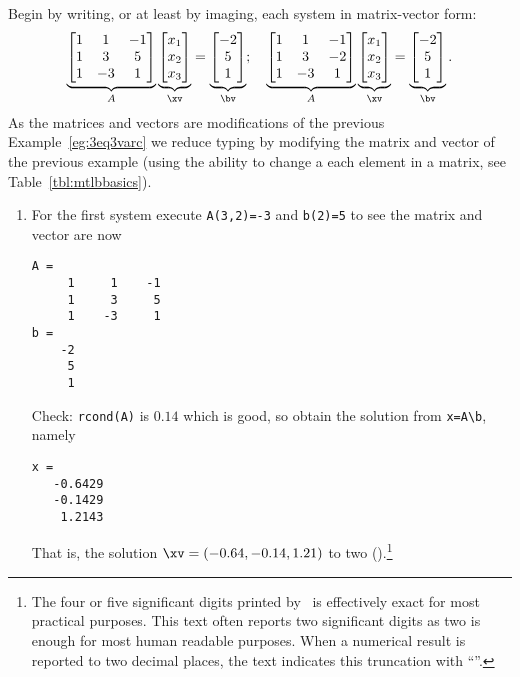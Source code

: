 \begin{example}
\begin{solution} 
Begin by writing, or at least by imaging, each system in matrix-vector form:
\begin{equation*}
\underbrace{\begin{bmatrix} 1&1&-1\\ 1&3&5\\1&-3&1 \end{bmatrix}}_A
\underbrace{\begin{bmatrix} x_1\\x_2\\x_3 \end{bmatrix}}_\xv
=\underbrace{\begin{bmatrix} -2\\5\\1 \end{bmatrix}}_\bv ;
\quad
\underbrace{\begin{bmatrix} 1&1&-1\\ 1&3&-2\\1&-3&1 \end{bmatrix}}_A
\underbrace{\begin{bmatrix} x_1\\x_2\\x_3 \end{bmatrix}}_\xv
=\underbrace{\begin{bmatrix} -2\\5\\1 \end{bmatrix}}_\bv .
\end{equation*}
As the matrices and vectors are modifications of the previous Example~\ref{eg:3eq3varc} we reduce typing by modifying the matrix and vector of the previous example (using the ability to change a each element in a matrix, see Table~\ref{tbl:mtlbbasics}).
\begin{enumerate}
\item For the first system execute \verb|A(3,2)=-3| and \verb|b(2)=5|
to see the matrix and vector are now
\begin{verbatim}
A =
     1     1    -1
     1     3     5
     1    -3     1
b =
    -2
     5
     1
\end{verbatim}
Check: \verb|rcond(A)| is \(0.14\) which is good, so obtain the solution from \verb|x=A\b|, namely
\begin{verbatim}
x =
   -0.6429
   -0.1429
    1.2143
\end{verbatim}
That is, the solution \(\xv=(-0.64,-0.14,1.21)\) to two  ().\footnote{The four or five significant digits printed by \script\ is effectively exact for most practical purposes.
This text often reports two significant digits as two is enough for most human readable purposes.
When a numerical result is reported to two decimal places, the text indicates this truncation with ``\twodp''.}


\end{enumerate}
\end{solution}
\end{example}
